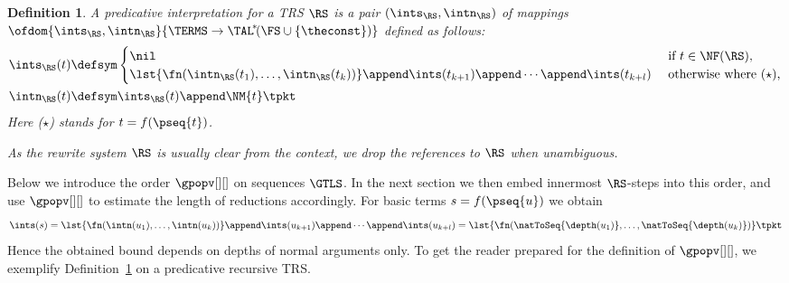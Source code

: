 \documentclass{LMCS}
\newtheorem{definition}[thm]{Definition}
\begin{document}
\begin{definition}\label{d:pi}
A \emph{predicative interpretation} for a TRS $\RS$
is a pair $(\ints_\RS,\intn_\RS)$ of mappings $\ofdom{\ints_\RS,\intn_\RS}{\TERMS \to \TAL^{\!\ast}\!(\FS \cup \{\theconst\})}$
defined as follows:
\begin{align*}
  \ints_\RS(t) & \defsym
  \begin{cases}
    \nil & \text{ if $t \in \NF(\RS)$,} \\
    \lst{\fn(\intn_\RS(t_1), \dots, \intn_\RS(t_k))} \append \ints(t_{k+1}) \append \cdots \append \ints(t_{k+l}) & \text{ otherwise where ($\star$),}
  \end{cases}\\
  \intn_\RS(t) & \defsym \ints_\RS(t) \append \NM{t} \tpkt
\end{align*}
Here ($\star$) stands for $t = f(\pseq{t})$.

As the rewrite system $\RS$ is usually clear from the context, we drop the references 
to $\RS$ when unambiguous.
\end{definition}

Below we introduce the order $\gpopv[][]$ on sequences $\GTLS$. 
In the next section we then embed innermost $\RS$-steps into this order, 
and use $\gpopv[][]$ to estimate the length of reductions accordingly.
For basic terms $s = f(\pseq{u})$ we obtain
$$
\ints(s) = \lst{\fn(\intn(u_1),\dots,\intn(u_k))} \append \ints(u_{k+1}) \append \cdots \append \ints(u_{k+l}) 
= \lst{\fn(\natToSeq{\depth(u_1)},\dots,\natToSeq{\depth(u_k)})}
\tpkt
$$
Hence the obtained bound depends on depths of normal arguments only. 
To get the reader prepared for the definition of $\gpopv[][]$, 
we exemplify Definition~\ref{d:pi} on a predicative recursive TRS.
\end{document}

